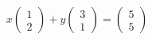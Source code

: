 \documentclass[preview]{standalone}
\begin{document}
\begin{align*}
x \begin{pmatrix} 1 \\ 2 \end{pmatrix} + y \begin{pmatrix} 3 \\ 1 \end{pmatrix} = \begin{pmatrix} 5 \\ 5 \end{pmatrix}
\end{align*}
\end{document}
